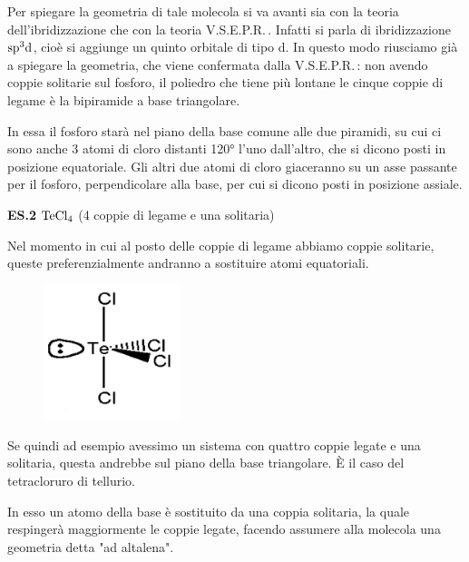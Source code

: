 \vspace{0.2cm}Per spiegare la geometria di tale molecola si va avanti sia con la teoria dell'ibridizzazione che con la teoria V.S.E.P.R.\,. Infatti si parla di ibridizzazione $\rm sp^3d$, cioè si aggiunge un quinto orbitale di tipo d. In questo modo riusciamo già a spiegare la geometria, che viene confermata dalla V.S.E.P.R.\,: non avendo coppie solitarie sul fosforo, il poliedro che tiene più lontane le cinque coppie di legame è la bipiramide a base triangolare.   

In essa il fosforo starà nel piano della base comune alle due piramidi, su cui ci sono anche 3 atomi di cloro distanti 120° l'uno dall'altro, che si dicono posti in posizione equatoriale. Gli altri due atomi di cloro giaceranno su un asse passante per il fosforo, perpendicolare alla base, per cui si dicono posti in posizione assiale.

\vspace{0.2cm}\textbf{ES.2} $\rm TeCl_4$ (4 coppie di legame e una solitaria)

\vspace{0.2cm}Nel momento in cui al posto delle coppie di legame abbiamo coppie solitarie, queste preferenzialmente andranno a sostituire atomi equatoriali.

\hspace{0.5cm}\begin{minipage}{0.2\textwidth}
    \begin{figure}[H]
        \includegraphics[width=4cm]{immagini/TeCl_4.png}
    \end{figure}
\end{minipage} \hfill
\begin{minipage}{0.65\textwidth}
    \vspace{0.4cm}
    Se quindi ad esempio avessimo un sistema con quattro coppie legate e una solitaria, questa andrebbe sul piano della base triangolare. È il caso del tetracloruro di tellurio.

    In esso un atomo della base è sostituito da una coppia solitaria, la quale respingerà maggiormente le coppie legate, facendo assumere alla molecola una geometria detta "ad altalena".
\end{minipage}

